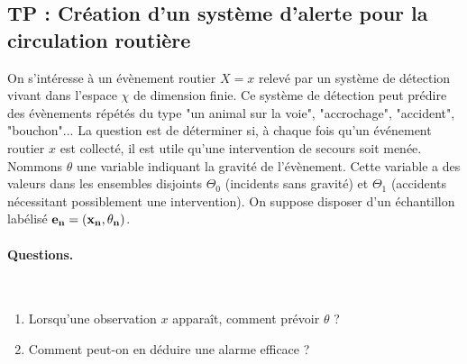 \subsection{TP : Création d'un système d'alerte pour la circulation routière}

On s'intéresse à un évènement routier $X=x$ relevé par un système de détection vivant dans l'espace $\chi$ de dimension finie. Ce système de détection peut prédire des évènements répétés du type "un animal sur la voie", "accrochage", "accident", "bouchon"... La question est de déterminer si, à chaque fois qu'un événement routier $x$ est collecté, il est utile qu'une intervention de secours soit menée. \\

Nommons $\theta$ une variable indiquant la gravité de l'évènement. Cette variable a des valeurs dans les ensembles disjoints $\Theta_0$ (incidents sans gravité) et $\Theta_1$   (accidents nécessitant possiblement une intervention). On suppose disposer d'un échantillon labélisé  ${\bf e_n}=({\bf x_n},{\bf \theta_n})$. \\

\paragraph{\bf Questions.} \\
\begin{enumerate}
\item Lorsqu'une observation $x$ apparaît, comment prévoir $\theta$ ?
\item Comment peut-on en déduire une alarme efficace ? 
\end{enumerate}

\if{} 
\fi


